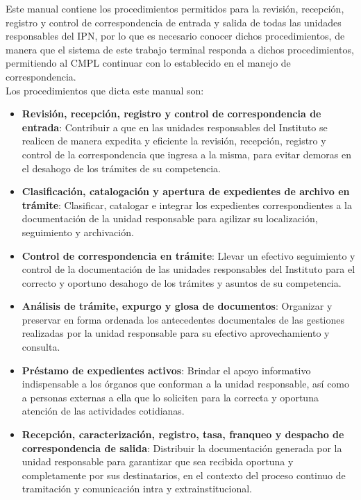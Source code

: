 	Este manual contiene los procedimientos permitidos para la revisión, recepción, registro y control de correspondencia de entrada y salida de todas las unidades responsables del IPN, por lo que es necesario conocer dichos procedimientos, de manera que el sistema de este trabajo terminal responda a dichos procedimientos, permitiendo al CMPL continuar con lo establecido en el manejo de correspondencia.\\
	
	Los procedimientos que dicta este manual son:\\
	
	\begin{itemize}
		\item \textbf{Revisión, recepción, registro y control de correspondencia de entrada}: Contribuir a que en las unidades responsables del Instituto se realicen de manera expedita y eficiente la revisión, recepción, registro y control de la correspondencia que ingresa a la misma, para evitar demoras en el desahogo de los trámites de su competencia\cite{ManProcyArcIPN}.
		\item \textbf{Clasificación, catalogación y apertura de expedientes de archivo en trámite}: Clasificar, catalogar e integrar los expedientes correspondientes a la documentación de la unidad responsable para agilizar su localización, seguimiento y archivación\cite{ManProcyArcIPN}.
		\item \textbf{Control de correspondencia en trámite}: Llevar un efectivo seguimiento y control de la documentación de las unidades responsables del Instituto para el correcto y oportuno desahogo de los trámites y asuntos de su competencia\cite{ManProcyArcIPN}.
		\item  \textbf{Análisis de trámite, expurgo y glosa de documentos}: Organizar y preservar en forma ordenada los antecedentes documentales de las gestiones realizadas por la unidad responsable para su efectivo aprovechamiento y consulta\cite{ManProcyArcIPN}.
		\item  \textbf{Préstamo de expedientes activos}: Brindar el apoyo informativo indispensable a los órganos que conforman a la unidad responsable, así como a personas externas a ella que lo soliciten para la correcta y oportuna atención de las actividades cotidianas\cite{ManProcyArcIPN}.
		\item  \textbf{Recepción, caracterización, registro, tasa, franqueo y despacho de correspondencia de salida}: Distribuir la documentación generada por la unidad responsable para garantizar que sea recibida oportuna y completamente por sus destinatarios, en el contexto del proceso continuo de tramitación y comunicación intra y extrainstitucional\cite{ManProcyArcIPN}.

\end{itemize}
